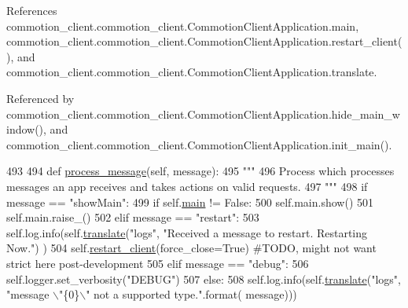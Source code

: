 References commotion\+\_\+client.\+commotion\+\_\+client.\+Commotion\+Client\+Application.\+main, commotion\+\_\+client.\+commotion\+\_\+client.\+Commotion\+Client\+Application.\+restart\+\_\+client(), and commotion\+\_\+client.\+commotion\+\_\+client.\+Commotion\+Client\+Application.\+translate.



Referenced by commotion\+\_\+client.\+commotion\+\_\+client.\+Commotion\+Client\+Application.\+hide\+\_\+main\+\_\+window(), and commotion\+\_\+client.\+commotion\+\_\+client.\+Commotion\+Client\+Application.\+init\+\_\+main().


\begin{DoxyCode}
493 
494     \textcolor{keyword}{def }\hyperlink{classcommotion__client_1_1commotion__client_1_1CommotionClientApplication_a981d54a4d40a4345a253be2b2a541127}{process\_message}(self, message):
495         \textcolor{stringliteral}{"""}
496 \textcolor{stringliteral}{        Process which processes messages an app receives and takes actions on valid requests.}
497 \textcolor{stringliteral}{        """}
498         \textcolor{keywordflow}{if} message == \textcolor{stringliteral}{"showMain"}:
499             \textcolor{keywordflow}{if} self.\hyperlink{classcommotion__client_1_1commotion__client_1_1CommotionClientApplication_a4ae692cf60dc0a935cf2e8a72f657d1a}{main} != \textcolor{keyword}{False}:
500                 self.main.show()
501                 self.main.raise\_()
502         \textcolor{keywordflow}{elif} message == \textcolor{stringliteral}{"restart"}:
503             self.log.info(self.\hyperlink{classcommotion__client_1_1commotion__client_1_1CommotionClientApplication_a57e951c9b241fb0e0c70055b4ca1b6f7}{translate}(\textcolor{stringliteral}{"logs"}, \textcolor{stringliteral}{"Received a message to restart. Restarting Now."})
      )
504             self.\hyperlink{classcommotion__client_1_1commotion__client_1_1CommotionClientApplication_af40aa0ed2df54b7edb7f3e474b336a63}{restart\_client}(force\_close=\textcolor{keyword}{True}) \textcolor{comment}{#TODO, might not want strict here
       post-development}
505         \textcolor{keywordflow}{elif} message == \textcolor{stringliteral}{"debug"}:
506             self.logger.set\_verbosity(\textcolor{stringliteral}{"DEBUG"})
507         \textcolor{keywordflow}{else}:
508             self.log.info(self.\hyperlink{classcommotion__client_1_1commotion__client_1_1CommotionClientApplication_a57e951c9b241fb0e0c70055b4ca1b6f7}{translate}(\textcolor{stringliteral}{"logs"}, \textcolor{stringliteral}{"message \(\backslash\)"\{0\}\(\backslash\)" not a supported type."}.format(
      message)))

\end{DoxyCode}

